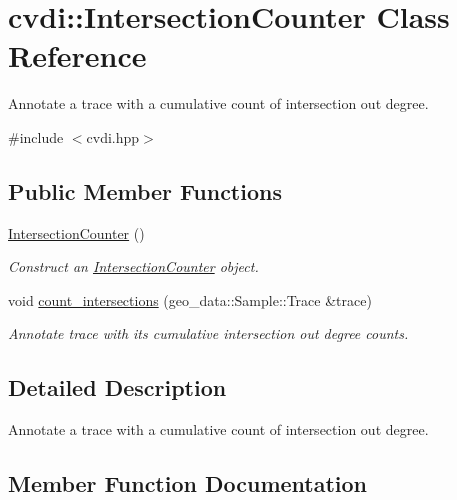 \hypertarget{classcvdi_1_1IntersectionCounter}{}\section{cvdi\+:\+:Intersection\+Counter Class Reference}
\label{classcvdi_1_1IntersectionCounter}


Annotate a trace with a cumulative count of intersection out degree.  




{\ttfamily \#include $<$cvdi.\+hpp$>$}

\subsection*{Public Member Functions}
\begin{DoxyCompactItemize}
\item 
\hyperlink{classcvdi_1_1IntersectionCounter_ac6e71f51b6686f8f39fd19f2cd85fb5f}{Intersection\+Counter} ()\hypertarget{classcvdi_1_1IntersectionCounter_ac6e71f51b6686f8f39fd19f2cd85fb5f}{}\label{classcvdi_1_1IntersectionCounter_ac6e71f51b6686f8f39fd19f2cd85fb5f}

\begin{DoxyCompactList}\small\item\em Construct an \hyperlink{classcvdi_1_1IntersectionCounter}{Intersection\+Counter} object. \end{DoxyCompactList}\item 
void \hyperlink{classcvdi_1_1IntersectionCounter_a9be51eac7462fc03c5c6bb5cca5894dc}{count\+\_\+intersections} (geo\+\_\+data\+::\+Sample\+::\+Trace \&trace)
\begin{DoxyCompactList}\small\item\em Annotate trace with its cumulative intersection out degree counts. \end{DoxyCompactList}\end{DoxyCompactItemize}


\subsection{Detailed Description}
Annotate a trace with a cumulative count of intersection out degree. 

\subsection{Member Function Documentation}

